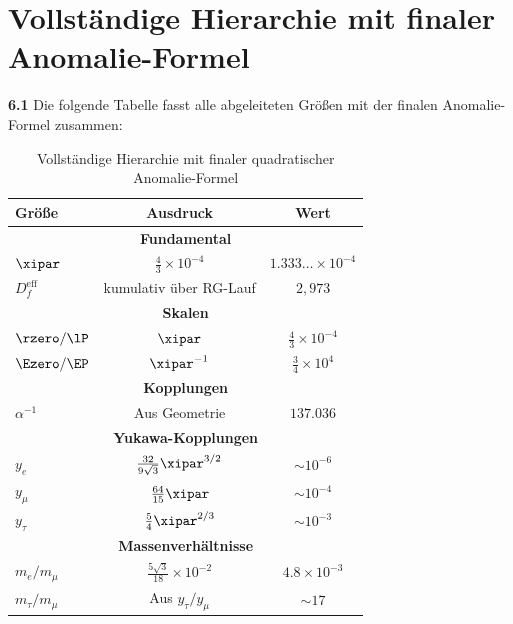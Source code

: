 
	\section{Vollständige Hierarchie mit finaler Anomalie-Formel}
	
	\noindent \textbf{6.1} Die folgende Tabelle fasst alle abgeleiteten Größen mit der finalen Anomalie-Formel zusammen:
	
	\begin{table}[h]
		\centering
		\begin{tabular}{lcc}
			\toprule
			\textbf{Größe} & \textbf{Ausdruck} & \textbf{Wert} \\
			\midrule
			\multicolumn{3}{c}{\textbf{Fundamental}} \\
			$\xipar$ & $\frac{4}{3} \times 10^{-4}$ & $1.333\ldots \times 10^{-4}$ \\
			$D_f^{\text{eff}}$ & kumulativ über RG-Lauf & $2{,}973$ \\
			\midrule
			\multicolumn{3}{c}{\textbf{Skalen}} \\
			$\rzero/\lP$ & $\xipar$ & $\frac{4}{3} \times 10^{-4}$ \\
			$\Ezero/\EP$ & $\xipar^{-1}$ & $\frac{3}{4} \times 10^{4}$ \\
			\midrule
			\multicolumn{3}{c}{\textbf{Kopplungen}} \\
			$\alpha^{-1}$ & Aus Geometrie & $137.036$ \\
			\midrule
			\multicolumn{3}{c}{\textbf{Yukawa-Kopplungen}} \\
			$y_e$ & $\frac{32}{9\sqrt{3}} \xipar^{3/2}$ & $\sim 10^{-6}$ \\
			$y_\mu$ & $\frac{64}{15} \xipar$ & $\sim 10^{-4}$ \\
			$y_\tau$ & $\frac{5}{4} \xipar^{2/3}$ & $\sim 10^{-3}$ \\
			\midrule
			\multicolumn{3}{c}{\textbf{Massenverhältnisse}} \\
			$m_e/m_\mu$ & $\frac{5 \sqrt{3}}{18} \times 10^{-2}$ & $4.8 \times 10^{-3}$ \\
			$m_\tau/m_\mu$ & Aus $y_\tau/y_\mu$ & $\sim 17$ \\
			\midrule

		\end{tabular}
		\caption{Vollständige Hierarchie mit finaler quadratischer Anomalie-Formel}
	\end{table}
	
